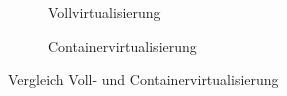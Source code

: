 \begin{figure}
      \centering
      \begin{subfigure}{.5\textwidth}
            \centering
            
            \caption{Vollvirtualisierung}
            \label{fig:full-virtualization}
      \end{subfigure}%
      \begin{subfigure}{.5\textwidth}
            \centering
            
            \caption{Containervirtualisierung}
            \label{fig:container-virtualization}
      \end{subfigure}
      \caption{Vergleich Voll- und Containervirtualisierung}
      \label{fig:virtualization-comparison}
\end{figure}


